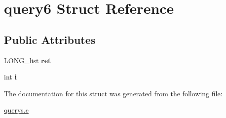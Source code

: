 \hypertarget{structquery6}{}\section{query6 Struct Reference}
\label{structquery6}
\subsection*{Public Attributes}
\begin{DoxyCompactItemize}
\item 
L\+O\+N\+G\+\_\+list {\bfseries ret}\hypertarget{structquery6_a54e048e60d32eb91c8865fdc7ae754b6}{}\label{structquery6_a54e048e60d32eb91c8865fdc7ae754b6}

\item 
int {\bfseries i}\hypertarget{structquery6_a67cd2b7fea890ab8345bb392e4454a99}{}\label{structquery6_a67cd2b7fea890ab8345bb392e4454a99}

\end{DoxyCompactItemize}


The documentation for this struct was generated from the following file\+:\begin{DoxyCompactItemize}
\item 
\hyperlink{querys_8c}{querys.\+c}\end{DoxyCompactItemize}
